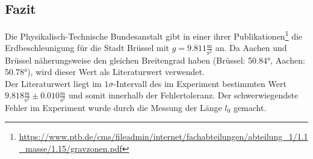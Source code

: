 \subsection{Fazit}
Die Physikalisch-Technische Bundesanstalt gibt in einer ihrer Publikationen\footnote{\url{https://www.ptb.de/cms/fileadmin/internet/fachabteilungen/abteilung_1/1.1_masse/1.15/gravzonen.pdf}} die Erdbeschleunigung für die Stadt Brüssel mit $g = 9.811 \frac{\text{m}}{\text{s}^2}$ an. Da Aachen und Brüssel näherungsweise den gleichen Breitengrad haben (Brüssel: 50.84°, Aachen: 50.78°), wird dieser Wert als Literaturwert verwendet. \\
Der Literaturwert liegt im $1\sigma$-Intervall des im Experiment bestimmten Wert $9.818 \frac{\text{m}}{\text{s}^2} \pm 0.010 \frac{\text{m}}{\text{s}^2}$ und somit innerhalb der Fehlertoleranz. Der schwerwiegendste Fehler im Experiment wurde durch die Messung der Länge $l_0$ gemacht. 